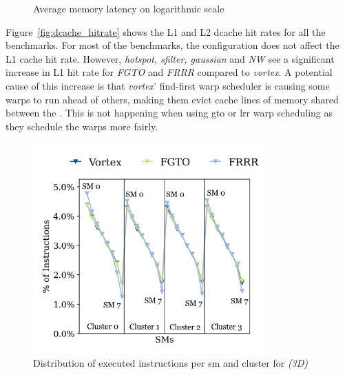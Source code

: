 \begin{figure}
    \centering
    \caption{Average memory latency on logarithmic scale}
    \label{fig:avg_mem_latency}
\end{figure}

Figure~\ref{fig:dcache_hitrate} shows the L1 and L2 dcache hit rates for all the benchmarks. For most of the benchmarks, the configuration does not affect the L1 cache hit rate. However, \textit{hotspot, sfilter, gaussian} and \textit{NW} see a significant increase in L1 hit rate for \textit{FGTO} and \textit{FRRR} compared to \textit{\Gls{vortex}}. A potential cause of this increase is that \textit{\Gls{vortex}}' find-first warp scheduler is causing some warps to run ahead of others, making them evict cache lines of memory shared between the . This is not happening when using \acrshort{gto} or \acrshort{lrr} warp scheduling as they schedule the warps more fairly.

\begin{figure}
    \centering
    \includegraphics[width=0.8\textwidth]{figures/instruction_distribution/hotspot3D_unsorted_numbered.png}
    \caption[Distribution of executed instructions in clusters for Hotspot3D]{Distribution of executed instructions per \acrshort{sm} and cluster for  \textit{(3D)}}
    \label{fig:instruction_distribution_unsorted_3D}
\end{figure}

